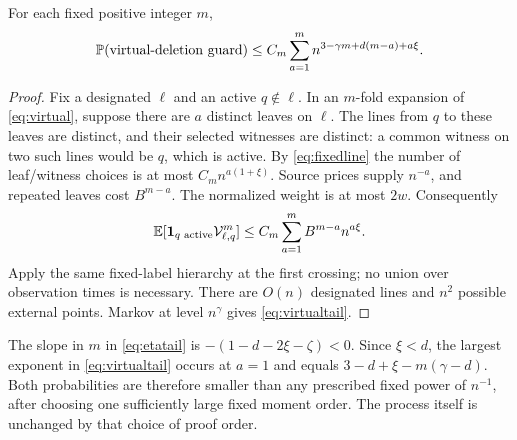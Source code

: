 \begin{lemma}\label{lem:virtualtail}
For each fixed positive integer \(m\),
\begin{equation}\label{eq:virtualtail}
 \mathbb P(\text{virtual-deletion guard})
 \le C_m\sum_{a=1}^m n^{3-\gamma m+d(m-a)+a\xi}.
\end{equation}
\end{lemma}
\begin{proof}
Fix a designated \(\ell\) and an active \(q\notin\ell\).
In an \(m\)-fold expansion of \eqref{eq:virtual}, suppose there are
\(a\) distinct leaves on \(\ell\). The lines from \(q\) to these
leaves are distinct, and their selected witnesses are distinct:
a common witness on two such lines would be \(q\), which is active.
By \eqref{eq:fixedline} the number of leaf/witness choices is at most
\(C_m n^{a(1+\xi)}\). Source prices supply \(n^{-a}\), and repeated
leaves cost \(B^{m-a}\). The normalized weight is at most \(2w\).
Consequently
\[
 \mathbb E[\mathbf 1_{q\text{ active}}\mathcal V_{\ell,q}^m]
 \le C_m\sum_{a=1}^m B^{m-a}n^{a\xi}.
\]
Apply the same fixed-label hierarchy at the first crossing; no
union over observation times is necessary. There are \(O(n)\)
designated lines and \(n^2\) possible external points. Markov at
level \(n^\gamma\) gives \eqref{eq:virtualtail}.
\end{proof}

The slope in \(m\) in \eqref{eq:etatail} is
\(-(1-d-2\xi-\zeta)<0\). Since \(\xi<d\), the largest exponent in
\eqref{eq:virtualtail} occurs at \(a=1\) and equals
\(3-d+\xi-m(\gamma-d)\). Both probabilities are therefore smaller
than any prescribed fixed power of \(n^{-1}\), after choosing one
sufficiently large fixed moment order. The process itself is unchanged
by that choice of proof order.



